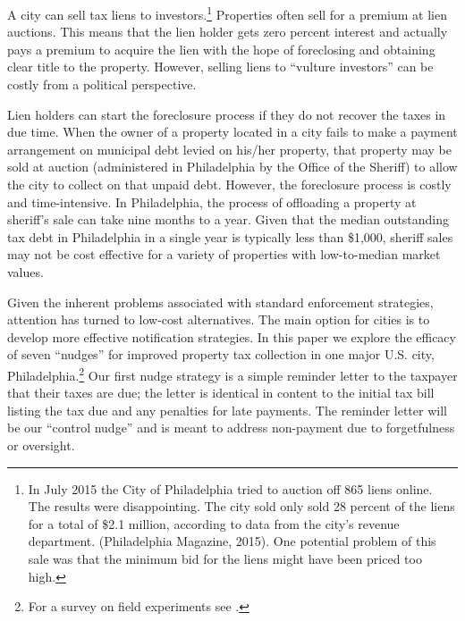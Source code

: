 \documentclass[12pt]{article}
\begin{document}
A city can sell tax liens to investors.\footnote{In July 2015 the City
  of Philadelphia tried to auction off 865 liens online. The results
  were disappointing. The city sold only sold 28 percent of the liens
  for a total of \$2.1 million, according to data from the city's
  revenue department. (Philadelphia Magazine, 2015). One potential
  problem of this sale was that the minimum bid for the liens might
  have been priced too high.} Properties often sell for a premium at
lien auctions. This means that the lien holder gets zero percent
interest and actually pays a premium to acquire the lien with the hope
of foreclosing and obtaining clear title to the property. However,
selling liens to ``vulture investors'' can be costly from a political
perspective.

Lien holders can start the foreclosure process if they do not recover
the taxes in due time. When the owner of a property located in a city
fails to make a payment arrangement on municipal debt levied on
his/her property, that property may be sold at auction
(administered in Philadelphia by the Office of the Sheriff) to
allow the city to collect on that unpaid debt. However, the
foreclosure process is costly and time-intensive. In Philadelphia, the
process of offloading a property at sheriff's sale can take nine
months to a year. Given that the median outstanding tax debt in
Philadelphia in a single year is typically less than \$1,000, sheriff
sales may not be cost effective for a variety of properties with
low-to-median market values.

Given the inherent problems associated with standard enforcement
strategies, attention has turned to low-cost alternatives. The main
option for cities is to develop more effective notification
strategies.  In this paper we explore the efficacy of seven ``nudges''
for improved property tax collection in one major U.S. city,
Philadelphia.\footnote{For a survey on field experiments see .}
 Our first nudge strategy is a simple reminder letter to
the taxpayer that their taxes are due; the letter is identical in
content to the initial tax bill listing the tax due and any penalties
for late payments.  The reminder letter will be our ``control nudge''
and is meant to address non-payment due to forgetfulness or oversight.
\end{document}

